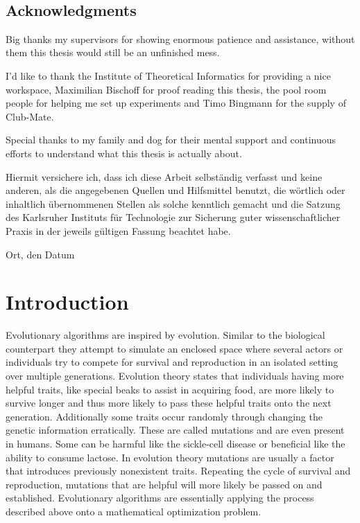 \documentclass[a4paper,12pt,titlepage, BCOR7mm,headsepline]{scrbook}
\numberwithin{equation}{section}
\begin{document}
\vfill\vfill\vfill
\ 
\newpage
\clearpage
\ 
\newpage
\clearpage

\section*{Acknowledgments}
Big thanks my supervisors for showing enormous patience and assistance, without them this thesis would still be an unfinished mess. 

I'd like to thank the Institute of Theoretical Informatics for providing a nice workspace, Maximilian Bischoff for proof reading this thesis, 
the pool room people for helping me set up experiments and Timo Bingmann for the supply of Club-Mate. 

Special thanks to my family and dog for their mental support and continuous efforts to understand what this thesis is actually about. 

\vfill\vfill\vfill
Hiermit versichere ich, dass ich diese Arbeit selbständig verfasst und keine anderen, als die angegebenen Quellen und Hilfsmittel benutzt, die wörtlich oder inhaltlich übernommenen Stellen als solche kenntlich gemacht und die Satzung des Karlsruher Instituts für Technologie zur Sicherung guter wissenschaftlicher Praxis in der jeweils gültigen Fassung beachtet habe.

\bigskip
\vspace*{1cm}
\noindent
Ort, den Datum

\clearpage

\tableofcontents
\clearpage
\clearpage
\mainmatter
\pagestyle{plain}
\chapter{Introduction}
\pagestyle{headings}
Evolutionary algorithms are inspired by evolution. Similar to the biological counterpart they attempt to simulate 
an enclosed space where several actors or individuals try to compete for survival and reproduction in an isolated setting over multiple generations.
Evolution theory states that individuals having more helpful traits, like special beaks to assist in acquiring food, are more likely to survive longer and 
thus more likely to pass these helpful traits onto the next generation. Additionally some traits occur randomly through changing the genetic information erratically. These are called mutations and are even present in humans. Some can be harmful like the sickle-cell disease or beneficial like the ability to consume lactose. In evolution theory mutations 
are usually a factor that introduces previously nonexistent traits. Repeating the cycle of survival and reproduction, mutations that are helpful will more likely be passed on and established. Evolutionary algorithms are essentially applying the process described above onto a mathematical optimization problem. 
%
%
%
%
%
%
\end{document}
